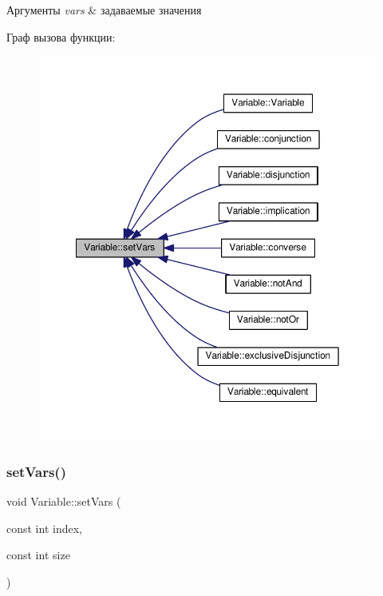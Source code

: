 \begin{DoxyParams}{Аргументы}
{\em vars} & задаваемые значения \\
\hline
\end{DoxyParams}
Граф вызова функции\+:\nopagebreak
\begin{figure}[H]
\begin{center}
\leavevmode
\includegraphics[width=350pt]{class_variable_ae6ac554c0382b43f9a3e37c6382d4471_icgraph}
\end{center}
\end{figure}
\mbox{\label{class_variable_a1f2f14a77dc0dbe91e6bd285afa67fc4}} 
\subsubsection{\texorpdfstring{set\+Vars()}{setVars()}\hspace{0.1cm}{\footnotesize\ttfamily [2/2]}}
{\footnotesize\ttfamily void Variable\+::set\+Vars (\begin{DoxyParamCaption}\item[{const int}]{index,  }\item[{const int}]{size }\end{DoxyParamCaption})}



